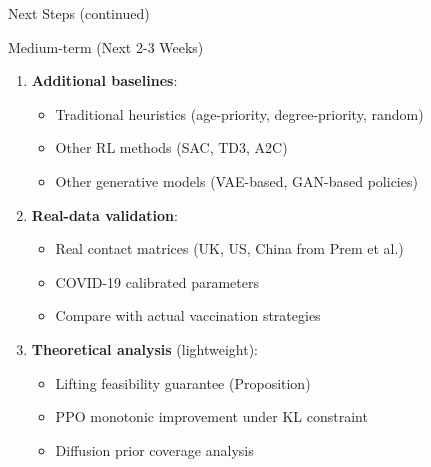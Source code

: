 \documentclass[aspectratio=169]{beamer}
\begin{document}
\begin{frame}{Next Steps (continued)}

\begin{block}{Medium-term (Next 2-3 Weeks)}
\begin{enumerate}
    \item \textbf{Additional baselines}:
    \begin{itemize}
        \item Traditional heuristics (age-priority, degree-priority, random)
        \item Other RL methods (SAC, TD3, A2C)
        \item Other generative models (VAE-based, GAN-based policies)
    \end{itemize}

    \item \textbf{Real-data validation}:
    \begin{itemize}
        \item Real contact matrices (UK, US, China from Prem et al.)
        \item COVID-19 calibrated parameters
        \item Compare with actual vaccination strategies
    \end{itemize}

    \item \textbf{Theoretical analysis} (lightweight):
    \begin{itemize}
        \item Lifting feasibility guarantee (Proposition)
        \item PPO monotonic improvement under KL constraint
        \item Diffusion prior coverage analysis
    \end{itemize}
\end{enumerate}
\end{block}

\end{frame}
\end{document}
